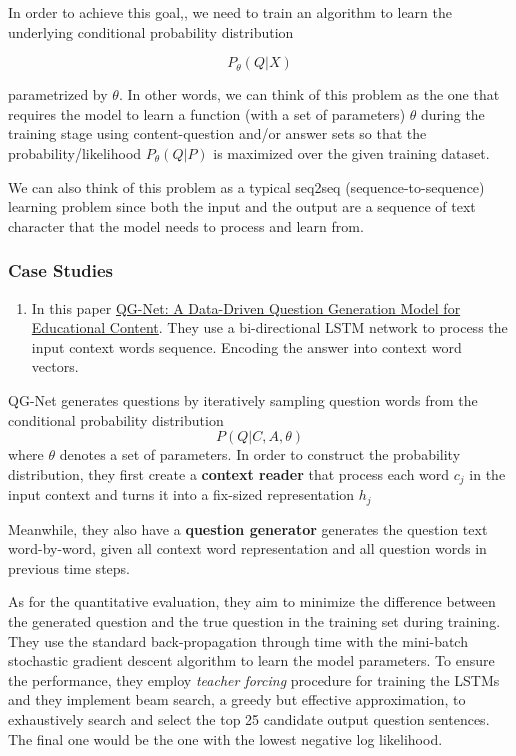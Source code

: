 \documentclass{acm_proc_article-sp}
\providecommand{\tightlist}{%
  \setlength{\itemsep}{0pt}\setlength{\parskip}{0pt}}
\begin{document}
In order to achieve this goal,, we need to train an algorithm to learn
the underlying conditional probability distribution

\[P_{\theta}(Q|X)\]

parametrized by \(\theta\). In other words, we can think of this problem
as the one that requires the model to learn a function (with a set of
parameters) \(\theta\) during the training stage using content-question
and/or answer sets so that the probability/likelihood
\(P_{\theta}(Q|P)\) is maximized over the given training dataset.

We can also think of this problem as a typical seq2seq
(sequence-to-sequence) learning problem since both the input and the
output are a sequence of text character that the model needs to process
and learn from.

\subsubsection{Case Studies}\label{case-studies}

\begin{enumerate}
\def\labelenumi{\arabic{enumi}.}
\tightlist
\item
  In this paper
  \href{http://www.princeton.edu/~shitingl/papers/18l@s-qgen.pdf}{QG-Net:
  A Data-Driven Question Generation Model for Educational Content}. They
  use a bi-directional LSTM network to process the input context words
  sequence. Encoding the answer into context word vectors.
\end{enumerate}

QG-Net generates questions by iteratively sampling question words from
the conditional probability distribution \[P(Q|C,A,\theta)\] where
\(\theta\) denotes a set of parameters. In order to construct the
probability distribution, they first create a \textbf{context reader}
that process each word \(c_j\) in the input context and turns it into a
fix-sized representation \(h_j\)

Meanwhile, they also have a \textbf{question generator} generates the
question text word-by-word, given all context word representation and
all question words in previous time steps.

As for the quantitative evaluation, they aim to minimize the difference
between the generated question and the true question in the training set
during training. They use the standard back-propagation through time
with the mini-batch stochastic gradient descent algorithm to learn the
model parameters. To ensure the performance, they employ \emph{teacher
forcing} procedure for training the LSTMs and they implement beam
search, a greedy but effective approximation, to exhaustively search and
select the top 25 candidate output question sentences. The final one
would be the one with the lowest negative log likelihood.
\end{document}
